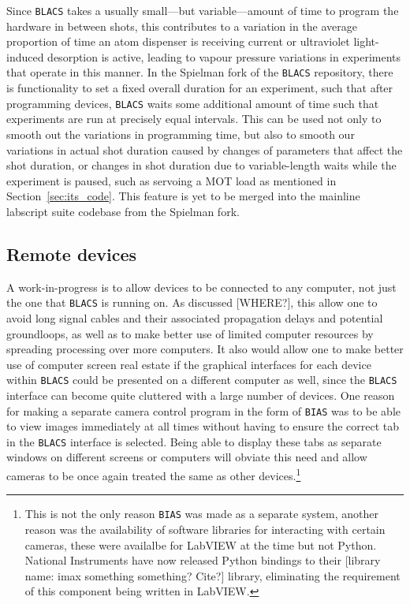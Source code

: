 Since \texttt{BLACS} takes a usually small---but variable---amount of time to program the hardware in between shots, this contributes to a variation in the average proportion of time an atom dispenser is receiving current or ultraviolet light-induced desorption is active, leading to vapour pressure variations in experiments that operate in this manner. In the Spielman fork of the \texttt{BLACS} repository, there is functionality to set a fixed overall duration for an experiment, such that after programming devices, \texttt{BLACS} waits some additional amount of time such that experiments are run at precisely equal intervals. This can be used not only to smooth out the variations in programming time, but also to smooth our variations in actual shot duration caused by changes of parameters that affect the shot duration, or changes in shot duration due to variable-length waits while the experiment is paused, such as servoing a MOT load as mentioned in Section~\ref{sec:its_code}. This feature is yet to be merged into the mainline labscript suite codebase from the Spielman fork.

\subsection{Remote devices}

A work-in-progress is to allow devices to be connected to any computer, not just the one that \texttt{BLACS} is running on. As discussed [WHERE?], this allow one to avoid long signal cables and their associated propagation delays and potential groundloops, as well as to make better use of limited computer resources by spreading processing over more computers. It also would allow one to make better use of computer screen real estate if the graphical interfaces for each device within \texttt{BLACS} could be presented on a different computer as well, since the \texttt{BLACS} interface can become quite cluttered with a large number of devices. One reason for making a separate camera control program in the form of \texttt{BIAS} was to be able to view images immediately at all times without having to ensure the correct tab in the \texttt{BLACS} interface is selected. Being able to display these tabs as separate windows on different screens or computers will obviate this need and allow cameras to be once again treated the same as other devices.\footnote{This is not the only reason \texttt{BIAS} was made as a separate system, another reason was the availability of software libraries for interacting with certain cameras, these were availalbe for LabVIEW at the time but not Python. National Instruments have now released Python bindings to their [library name: imax something something? Cite?] library, eliminating the requirement of this component being written in LabVIEW.}

